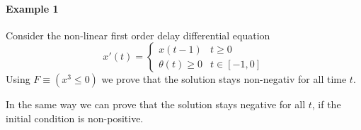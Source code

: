 \documentclass[10pt]{report}
\begin{document}
            \paragraph{Example 1}
                \label{sec:ddi-example-1}
                Consider the non-linear first order delay differential equation
                \begin{equation}
                    x'(t) = \begin{cases}
                         x(t-1) & t \geq 0\\
                         \theta(t)\geq 0 & t \in [-1,0]
                    \end{cases}
                \end{equation}
                Using $F\equiv(x^3\leq 0)$ we prove that the solution stays non-negativ for all time $t$.
                \begin{sequentdeduction}
                \end{sequentdeduction}
                In the same way we can prove that the solution stays negative for all $t$, if the initial condition is non-positive.
\end{document}
